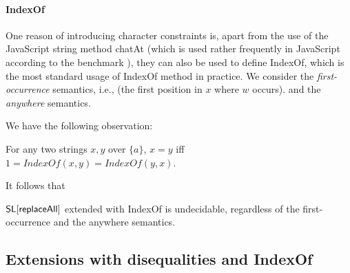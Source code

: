 \paragraph{IndexOf}
One reason of introducing character constraints is, apart from the use of the JavaScript string method chatAt (which is used rather frequently in JavaScript according to the benchmark \cite{}), they can also be used to define IndexOf, which is the most standard usage of IndexOf method in practice. We consider the \emph{first-occurrence} semantics, i.e., (the first position in $x$ where $w$ occurs).
and the \emph{anywhere} semantics. 

We have the following observation: 
\begin{lemma}
	For any two strings $x,y$ over $\{a\}$, $x=y$ iff $1=IndexOf(x,y)=IndexOf(y,x)$.  
\end{lemma}

It follows that 
\begin{proposition}
	$\mathsf{SL}[\mathsf{replaceAll}]$ extended with IndexOf is undecidable, regardless of the first-occurrence and the anywhere semantics. 
\end{proposition}

\subsection{Extensions with disequalities and IndexOf}